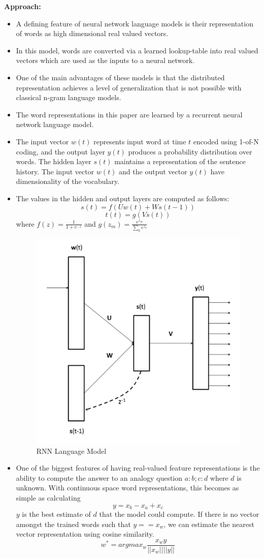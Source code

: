 \documentclass[11pt,a4paper]{article}
\begin{document}
  \textbf{Approach:}
  \begin{itemize}
    \item 
    A defining feature of neural network language models is their representation of words as high dimensional real valued vectors.
    \item 
    In this model, words are converted via a learned lookup-table into real valued vectors which are used as the inputs to a neural network.
    \item 
    One of the main advantages of these models is that the distributed representation achieves a level of generalization that is not possible with classical n-gram language models.
    \item 
    The word representations in this paper are learned by a recurrent neural network language model.
    \item 
    The input vector $w(t)$ represents input word at time $t$ encoded using 1-of-N coding, and the output layer $y(t)$ produces a probability distribution over words. The hidden layer $s(t)$ maintains a representation of the sentence history. The input vector $w(t)$ and the output vector $y(t)$ have dimensionality of the vocabulary.
    \item 
    The values in the hidden and output layers are computed as follows:
    $$s(t) = f(Uw(t) + Ws(t-1))$$
    $$t(t) = g(Vs(t))$$
    where
    $f(z) = \frac{1}{1 + e^{-z}}$ and $g(z_m) = \frac{e^{z_m}}{\sum_k e^{z_k}} $
    \begin{figure}[ht]
      \centering
      \includegraphics[width=.4\textwidth]{rnn-lang-model}
      \caption{RNN Language Model}
      \label{fig:rnn-lang-model}
    \end{figure}
    \item 
    One of the biggest features of having real-valued feature representations is the ability to compute the answer to an analogy question $a:b; c:d$ where $d$ is unknown. With continuous space word representations, this becomes as simple as calculating 
    $$y = x_b - x_a + x_c$$
    $y$ is the best estimate of $d$ that the model could compute. If there is no vector amongst the trained words such that $y == x_w$, we can estimate the nearest vector representation using cosine similarity.
    $$w^* = argmax_w \frac{x_w y}{||x_w|| ||y||}$$
  \end{itemize}
\end{document}
